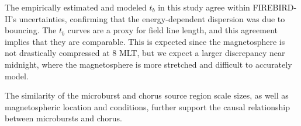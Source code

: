 \documentclass[draft, linenumbers]{agujournal}
\begin{document}
The empirically estimated and modeled $t_b$ in this study agree within FIREBIRD-II's uncertainties, confirming that the energy-dependent dispersion was due to bouncing. The $t_b$ curves are a proxy for field line length, and this agreement implies that they are comparable. This is expected since the magnetosphere is not drastically compressed at 8 MLT, but we expect a larger discrepancy near midnight, where the magnetosphere is more stretched and difficult to accurately model. 

The similarity of the microburst and chorus source region scale sizes, as well as magnetospheric location and conditions, further support the causal relationship between microbursts and chorus.






%
%
%
%
%
%
%
%
\end{document}
